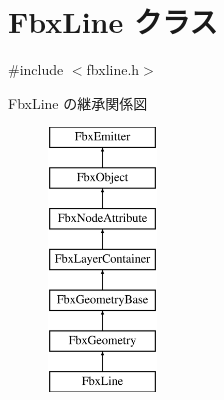 \hypertarget{class_fbx_line}{}\section{Fbx\+Line クラス}
\label{class_fbx_line}


{\ttfamily \#include $<$fbxline.\+h$>$}

Fbx\+Line の継承関係図\begin{figure}[H]
\begin{center}
\leavevmode
\includegraphics[height=7.000000cm]{class_fbx_line}
\end{center}
\end{figure}
